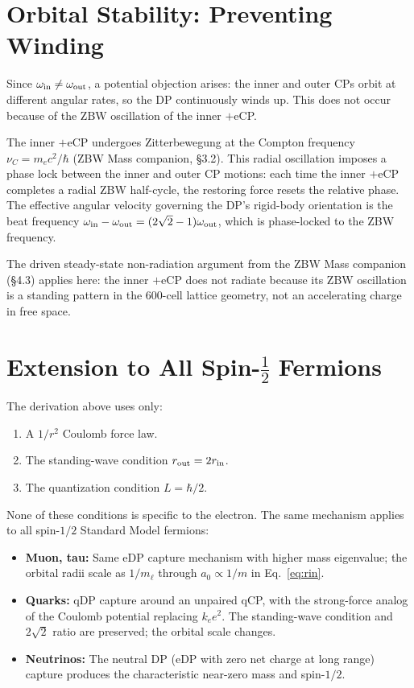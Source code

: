 \documentclass[12pt]{article}
\newcommand{\nuC}{\nu_C}
\newcommand{\rin}{r_{\rm in}}
\newcommand{\rout}{r_{\rm out}}
\newcommand{\oin}{\omega_{\rm in}}
\newcommand{\oout}{\omega_{\rm out}}
\newcommand{\aBohr}{a_0}
\begin{document}
\section{Orbital Stability: Preventing Winding}
\label{sec:stability}

Since $\oin \ne \oout$, a potential objection arises: the inner and
outer CPs orbit at different angular rates, so the DP continuously
winds up.  This does not occur because of the ZBW oscillation of the
inner $+$eCP.

The inner $+$eCP undergoes Zitterbewegung at the Compton frequency
$\nuC = m_e c^2/\hbar$ (ZBW Mass companion, \S3.2).  This radial
oscillation imposes a phase lock between the inner and outer CP
motions: each time the inner $+$eCP completes a radial ZBW half-cycle,
the restoring force resets the relative phase.  The effective angular
velocity governing the DP's rigid-body orientation is the
beat frequency $\oin - \oout = (2\sqrt{2}-1)\oout$, which is
phase-locked to the ZBW frequency.

The driven steady-state non-radiation argument from the ZBW Mass
companion (\S4.3) applies here: the inner $+$eCP does not radiate
because its ZBW oscillation is a standing pattern in the
600-cell lattice geometry, not an accelerating charge in free space.

\section{Extension to All Spin-$\tfrac{1}{2}$ Fermions}
\label{sec:extension}

The derivation above uses only:
\begin{enumerate}[noitemsep]
  \item A $1/r^2$ Coulomb force law.
  \item The standing-wave condition $\rout = 2\rin$.
  \item The quantization condition $L = \hbar/2$.
\end{enumerate}

None of these conditions is specific to the electron.  The same
mechanism applies to all spin-$1/2$ Standard Model fermions:

\begin{itemize}[noitemsep]
  \item \textbf{Muon, tau:} Same eDP capture mechanism with higher
    mass eigenvalue; the orbital radii scale as $1/m_\ell$ through
    $\aBohr \propto 1/m$ in Eq.~\eqref{eq:rin}.
  \item \textbf{Quarks:} qDP capture around an unpaired qCP, with
    the strong-force analog of the Coulomb potential replacing $k_e e^2$.
    The standing-wave condition and $2\sqrt{2}$ ratio are preserved;
    the orbital scale changes.
  \item \textbf{Neutrinos:} The neutral DP (eDP with zero net charge
    at long range) capture produces the characteristic near-zero mass
    and spin-$1/2$.
\end{itemize}
\end{document}
